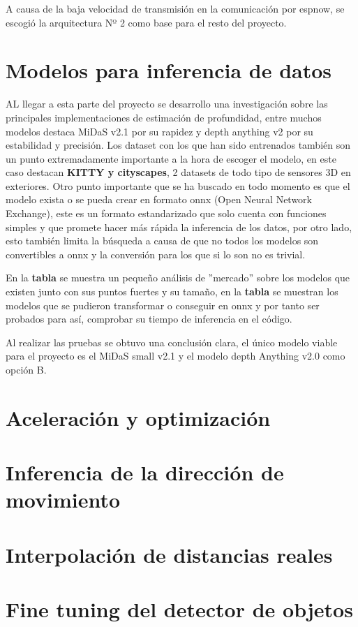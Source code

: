 A causa de la baja velocidad de transmisión en la comunicación por espnow, se escogió la arquitectura Nº 2 como base para el resto del proyecto.

    \section{Modelos para inferencia de datos}
AL llegar a esta parte del proyecto se desarrollo una investigación sobre las principales implementaciones de estimación de profundidad, entre muchos modelos destaca MiDaS v2.1 por su rapidez y depth anything v2 por su estabilidad y precisión. Los dataset con los que han sido entrenados también son un punto extremadamente importante a la hora de escoger el modelo, en este caso destacan \textbf{KITTY y cityscapes}, 2 datasets de todo tipo de sensores 3D en exteriores.
Otro punto importante que se ha buscado en todo momento es que el modelo exista o se pueda crear en formato onnx (Open Neural Network Exchange), este es un formato estandarizado que solo cuenta con funciones simples y que promete hacer más rápida la inferencia de los datos, por otro lado, esto también limita la búsqueda a causa de que no todos los modelos son convertibles a onnx y la conversión para los que si lo son no es trivial.

En la \textbf{tabla} se muestra un pequeño análisis de ''mercado'' sobre los modelos que existen junto con sus puntos fuertes y su tamaño, en la \textbf{tabla} se muestran los modelos que se pudieron transformar o conseguir en onnx y por tanto ser probados para así, comprobar su tiempo de inferencia en el código.



Al realizar las pruebas se obtuvo una conclusión clara, el único modelo viable para el proyecto es el MiDaS small v2.1 y el modelo depth Anything v2.0 como opción B.
    \section{Aceleración y optimización}
    \section{Inferencia de la dirección de movimiento}
    \section{Interpolación de distancias reales}
    \section{Fine tuning del detector de objetos}
